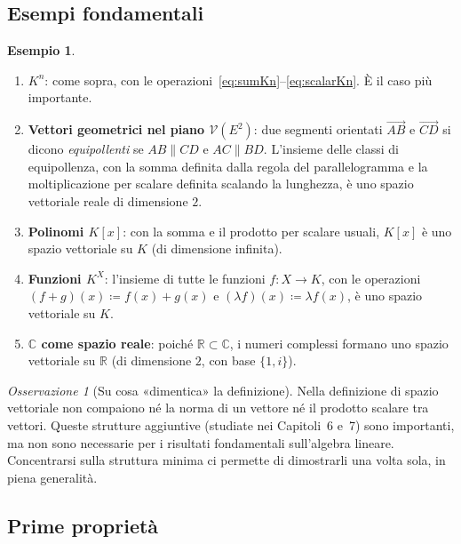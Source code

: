 \documentclass[11pt, a4paper]{book}
\theoremstyle{definition}
\newtheorem{esempio}[definizione]{Esempio}
\theoremstyle{plain}
\theoremstyle{remark}
\newtheorem{osservazione}[definizione]{Osservazione}
\newcommand{\R}{\mathbb{R}}
\newcommand{\C}{\mathbb{C}}
\begin{document}
\subsection{Esempi fondamentali}

\begin{exbox}
\begin{esempio}
\label{ex:esempiVett}
\begin{enumerate}
  \item \textbf{$K^n$}: come sopra, con le operazioni~\eqref{eq:sumKn}--\eqref{eq:scalarKn}. È il caso più importante.
  \item \textbf{Vettori geometrici nel piano $\mathcal{V}(E^2)$}: due segmenti orientati $\overrightarrow{AB}$ e $\overrightarrow{CD}$ si dicono \emph{equipollenti} se $AB \parallel CD$ e $AC \parallel BD$. L'insieme delle classi di equipollenza, con la somma definita dalla regola del parallelogramma e la moltiplicazione per scalare definita scalando la lunghezza, è uno spazio vettoriale reale di dimensione $2$.
  \item \textbf{Polinomi $K[x]$}: con la somma e il prodotto per scalare usuali, $K[x]$ è uno spazio vettoriale su $K$ (di dimensione infinita).
  \item \textbf{Funzioni $K^X$}: l'insieme di tutte le funzioni $f \colon X \to K$, con le operazioni $(f+g)(x) \coloneqq f(x)+g(x)$ e $(\lambda f)(x) \coloneqq \lambda f(x)$, è uno spazio vettoriale su $K$.
  \item \textbf{$\C$ come spazio reale}: poiché $\R \subset \C$, i numeri complessi formano uno spazio vettoriale su $\R$ (di dimensione $2$, con base $\{1, i\}$).
\end{enumerate}
\end{esempio}
\end{exbox}

\begin{osservazione}[Su cosa «dimentica» la definizione]
Nella definizione di spazio vettoriale non compaiono né la norma di un vettore né il prodotto scalare tra vettori. Queste strutture aggiuntive (studiate nei Capitoli~6 e~7) sono importanti, ma non sono necessarie per i risultati fondamentali sull'algebra lineare. Concentrarsi sulla struttura minima ci permette di dimostrarli una volta sola, in piena generalità.
\end{osservazione}

\subsection{Prime proprietà}
\end{document}
